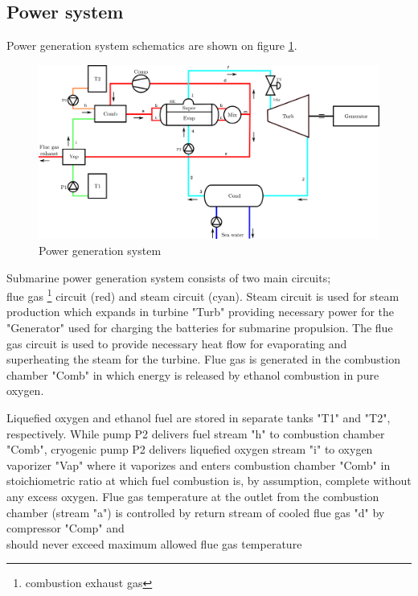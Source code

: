 \documentclass{article}
\begin{document}
	
	
	\subsection{Power system}
	
	Power generation system schematics are shown on figure \ref{fig:pwr_scheme}.
	
	\begin{figure}[h!]
		\centering
		\includegraphics[width=\textwidth]{terma.png}
		\caption{Power generation system}
		\label{fig:pwr_scheme}
	\end{figure}
	
	Submarine power generation system consists of two main circuits; \\
	flue gas \footnote{combustion exhaust gas} circuit (red) and steam 
	circuit (cyan). 
	Steam circuit is used for steam production which expands in turbine "Turb" 
	providing necessary power for the "Generator" used for charging the 
	batteries for submarine propulsion. The flue gas circuit is used to provide 
	necessary heat flow for evaporating and superheating the steam for the 
	turbine. Flue gas is generated in the combustion chamber "Comb" in which 
	energy is released by ethanol combustion in pure oxygen.
	
	Liquefied oxygen and ethanol fuel are stored in separate tanks "T1" and 
	"T2", respectively. While pump P2 delivers fuel stream "h" to combustion 
	chamber "Comb", cryogenic pump P2 delivers liquefied oxygen stream "i" to 
	oxygen vaporizer "Vap" where it vaporizes and enters combustion chamber 
	"Comb" in stoichiometric ratio at which fuel combustion is, by assumption, 
	complete without any excess oxygen. Flue gas temperature at the outlet from 
	the combustion chamber (stream "a") is controlled by return stream of 
	cooled flue gas "d" by compressor "Comp" and\\
	 should never exceed maximum allowed flue gas temperature %
	
\end{document}
